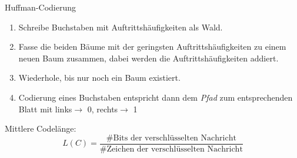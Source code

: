 \documentclass[german]{spicker}
\begin{document}
\begin{algo}{Huffman-Codierung}
    \begin{enumerate}
        \item Schreibe Buchstaben mit Auftrittshäufigkeiten als \glqq Wald\grqq.
        \item Fasse die beiden Bäume mit der geringsten Auftrittshäufigkeiten zu einem neuen Baum zusammen, dabei werden die Auftrittshäufigkeiten addiert.
        \item Wiederhole, bis nur noch ein Baum existiert.
        \item Codierung eines Buchstaben entspricht dann dem \emph{Pfad} zum entsprechenden Blatt mit \glqq links\grqq $\to$ 0, \glqq rechts\grqq $\to$ 1
    \end{enumerate}

    Mittlere Codelänge:
    $$
        L(C) = \frac{\#\text{Bits der verschlüsselten Nachricht}}{\#{\text{Zeichen der verschlüsselten Nachricht}}}
    $$
\end{algo}
\end{document}
